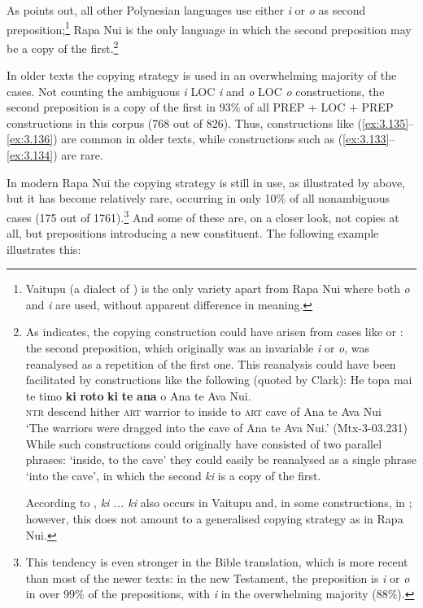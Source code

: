 As \citet[54–55]{Clark1976} points out, all other Polynesian languages use either \textit{i} or \textit{o} as second preposition;\footnote{\label{fn:142}Vaitupu (a dialect of ) is the only variety apart from Rapa Nui where both \textit{o} and \textit{i} are used, without apparent difference in meaning.} Rapa Nui is the only language in which the second preposition may be a copy of the first.\footnote{\label{fn:143}As \citet[56–57]{Clark1976} indicates, the copying construction could have arisen from cases like  or : the second preposition, which originally was an invariable \textit{i} or \textit{o}, was reanalysed as a repetition of the first one. This reanalysis could have been facilitated by constructions like the following (quoted by Clark):
\ea
\gll
He topa mai te timo \textbf{ki} \textbf{roto} \textbf{ki} \textbf{te} \textbf{{\ꞌ}ana} o {\ꞌ}Ana te Ava Nui.\\
\textsc{ntr} descend hither \textsc{art} warrior to inside to \textsc{art} cave of Ana te Ava Nui\\
\glt 
‘The warriors were dragged into the cave of Ana te Ava Nui.’ (Mtx-3-03.231)
\z While such constructions could originally have consisted of two parallel phrases: ‘inside, to the cave’ they could easily be reanalysed as a single phrase ‘into the cave’, in which the second \textit{ki} is a copy of the first.

According to \citet[27–28]{FinneyAlexander1998}, \textit{ki ... ki} also occurs in Vaitupu and, in some constructions, in ; however, this does not amount to a generalised copying strategy as in Rapa Nui.} 

In older texts the copying strategy is used in an overwhelming majority of the cases. Not counting the ambiguous \textit{{\ꞌ}i} LOC \textit{i} and \textit{o} LOC \textit{o} constructions, the second preposition is a copy of the first in 93\% of all PREP + LOC + PREP constructions in this corpus (768 out of 826). Thus, constructions like (\ref{ex:3.135}–\ref{ex:3.136}) are common in older texts, while constructions such as (\ref{ex:3.133}–\ref{ex:3.134}) are rare. 

In modern Rapa Nui the copying strategy is still in use, as illustrated by  above, but it has become relatively rare, occurring in only 10\% of all nonambiguous cases (175 out of 1761).\footnote{\label{fn:144}This tendency is even stronger in the Bible translation, which is more recent than most of the newer texts: in the new Testament, the preposition is \textit{i} or \textit{o} in over 99\% of the prepositions, with \textit{i} in the overwhelming majority (88\%).} And some of these are, on a closer look, not copies at all, but prepositions introducing a new constituent. The following example illustrates this:


